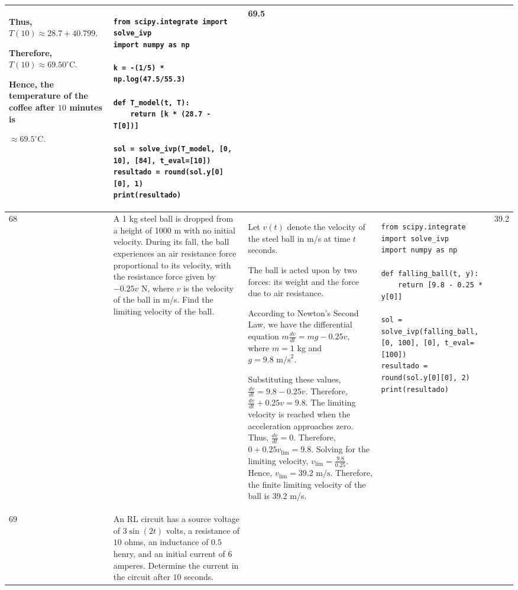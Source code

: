 \documentclass[a4paper,12pt]{article}
\begin{document}
\begin{longtable}{|p{0.3cm}|p{}|p{10cm}|p{}|p{1.5cm}|}
Thus, $T(10)\approx28.7+40.799.$

Therefore, $T(10)\approx69.50^\circ\mathrm{C}.$

Hence, the temperature of the coffee after $10$ minutes is

$\approx69.5^\circ\mathrm{C}.$

 &\begin{verbatim}
from scipy.integrate import solve_ivp
import numpy as np

k = -(1/5) * np.log(47.5/55.3)

def T_model(t, T):
    return [k * (28.7 - T[0])]

sol = solve_ivp(T_model, [0, 10], [84], t_eval=[10])
resultado = round(sol.y[0][0], 1)
print(resultado)
\end{verbatim} & 69.5 \\ \hline 
 68           & A 1 kg steel ball is dropped from a height of 1000 m with no initial velocity. During its fall, the ball experiences an air resistance force proportional to its velocity, with the resistance force given by $-0.25v$ N, where $v$ is the velocity of the ball in m/s. Find the limiting velocity of the ball.


              &Let $v(t)$ denote the velocity of the steel ball in m/s at time $t$ seconds.

The ball is acted upon by two forces: its weight and the force due to air resistance.

According to Newton's Second Law,
we have the differential equation 
$m\frac{dv}{dt}=mg-0.25v,$
where $m=1$ kg and $g=9.8\text{ m/s}^2.$

Substituting these values,$\frac{dv}{dt}=9.8-0.25v.$
Therefore,
$\frac{dv}{dt}+0.25v=9.8.$
The limiting velocity is reached when the acceleration approaches zero. Thus, $\frac{dv}{dt}=0.$
Therefore, $0+0.25v_{\mathrm{lim}}=9.8.$
Solving for the limiting velocity,
$v_{\mathrm{lim}}=\frac{9.8}{0.25}.$
Hence,
$v_{\mathrm{lim}}=39.2\text{ m/s}.$
Therefore, the finite limiting velocity of the ball is 39.2 m/s.
&\begin{verbatim}
from scipy.integrate import solve_ivp
import numpy as np

def falling_ball(t, y):
    return [9.8 - 0.25 * y[0]]

sol = solve_ivp(falling_ball, [0, 100], [0], t_eval=[100])
resultado = round(sol.y[0][0], 2)
print(resultado)
\end{verbatim} & 39.2 \\ \hline 
 69           & An RL circuit has a source voltage of $3\sin(2t)$ volts, a resistance of $10$ ohms, an inductance of $0.5$ henry, and an initial current of $6$ amperes. Determine the current in the circuit after $10$ seconds.



\end{longtable}
\end{document}
